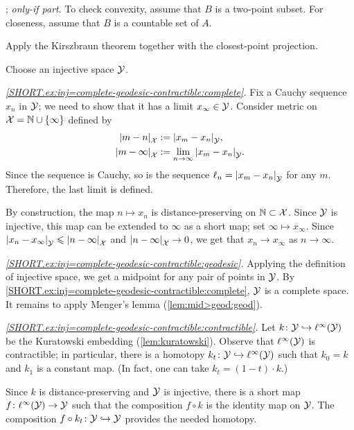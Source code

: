 \parbf{\ref{ex:conv-short}}; \textit{only-if part}.
To check convexity, assume that $B$ is a two-point subset.
For closeness, assume that $B$ is a countable set of $A$.

Apply the Kirszbraun theorem together with the closest-point projection.

\setcounter{eqtn}{0}


Choose an injective space $\mathcal{Y}$.

\textit{\ref{SHORT.ex:inj=complete-geodesic-contractible:complete}.}
Fix a Cauchy sequence $x_n$ in $\mathcal{Y}$;
we need to show that it has a limit $x_\infty\in \mathcal{Y}$.
Consider metric on $\mathcal{X}=\mathbb{N}\cup\{\infty\}$ defined by 
\begin{align*}
\dist{m}{n}{\spc{X}}&\df\dist{x_m}{x_n}{\spc{Y}},
\\
\dist{m}{\infty}{\spc{X}}&\df\lim_{n\to\infty}\dist{x_m}{x_n}{\spc{Y}}.
\end{align*}
Since the sequence is Cauchy, so is the sequence $\ell_n=\dist{x_m}{x_n}{\spc{Y}}$ for any $m$.
Therefore, the last limit is defined.

By construction, the map $n\mapsto x_n$ is distance-preserving on $\mathbb{N}\subset \mathcal{X}$.
Since $\mathcal{Y}$ is injective, this map can be extended to $\infty$ as a short map; set $\infty\mapsto x_\infty$.
Since $\dist{x_n}{x_\infty}{\spc{Y}}\le \dist{n}{\infty}{\spc{X}}$ 
and $\dist{n}{\infty}{\spc{X}}\to 0$, we get that
$x_n\to x_\infty$ as $n\to\infty$.

\textit{\ref{SHORT.ex:inj=complete-geodesic-contractible:geodesic}.}
Applying the definition of injective space, we get a midpoint for any pair of points in $\mathcal{Y}$.
By \ref{SHORT.ex:inj=complete-geodesic-contractible:complete},
$\mathcal{Y}$ is a complete space.
It remains to apply Menger's lemma (\ref{lem:mid>geod:geod}).

\textit{\ref{SHORT.ex:inj=complete-geodesic-contractible:contractible}.}
Let $k\colon\mathcal{Y}\hookrightarrow \ell^\infty(\mathcal{Y})$ be the Kuratowski embedding (\ref{lem:kuratowski}).
Observe that $\ell^\infty(\mathcal{Y})$ is contractible;
in particular, there is a homotopy $k_t\colon\mathcal{Y}\hookrightarrow \ell^\infty(\mathcal{Y})$ such that $k_0=k$ and $k_1$ is a constant map.
(In fact, one can take $k_t=(1-t)\cdot k$.)

Since $k$ is distance-preserving and $\mathcal{Y}$ is injective,
there is a short map $f\colon\ell^\infty(\mathcal{Y})\to \mathcal{Y}$ such that the composition $f\circ k$ is the identity map on $\mathcal{Y}$.
The composition $f\circ k_t\colon\mathcal{Y}\hookrightarrow \mathcal{Y}$ provides the needed homotopy. 

